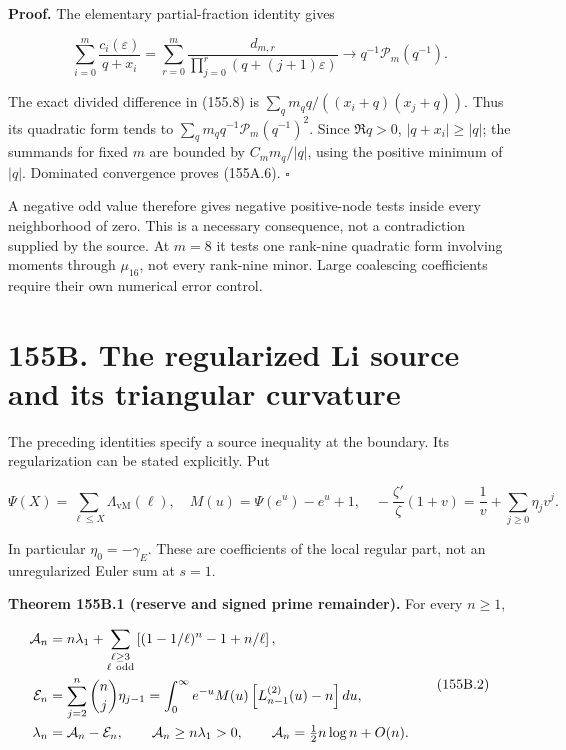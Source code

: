 \documentclass[
  11pt,
]{book}
\begin{document}
\textbf{Proof.} The elementary partial-fraction identity gives

\[
\sum_{i=0}^m\frac{c_i(\varepsilon)}{q+x_i}
=\sum_{r=0}^m\frac{d_{m,r}}{\prod_{j=0}^r(q+(j+1)\varepsilon)}
\longrightarrow q^{-1}\mathcal P_m(q^{-1}).
\]

The exact divided difference in (155.8) is
\(\sum_qm_qq/((x_i+q)(x_j+q))\). Thus its quadratic form tends to
\(\sum_qm_qq^{-1}\mathcal P_m(q^{-1})^2\). Since \(\Re q>0\),
\(|q+x_i|\ge|q|\); the summands for fixed \(m\) are bounded by
\(C_m m_q/|q|\), using the positive minimum of \(|q|\). Dominated
convergence proves (155A.6). \(\square\)

A negative odd value therefore gives negative positive-node tests inside
every neighborhood of zero. This is a necessary consequence, not a
contradiction supplied by the source. At \(m=8\) it tests one rank-nine
quadratic form involving moments through \(\mu_{16}\), not every
rank-nine minor. Large coalescing coefficients require their own
numerical error control.

\section{155B. The regularized Li source and its triangular
curvature}\label{b.-the-regularized-li-source-and-its-triangular-curvature}

The preceding identities specify a source inequality at the boundary.
Its regularization can be stated explicitly. Put

\[
\Psi(X)=\sum_{\ell\le X}\Lambda_{\mathrm{vM}}(\ell),\quad
M(u)=\Psi(e^u)-e^u+1,\quad
-\frac{\zeta'}{\zeta}(1+v)=\frac1v+\sum_{j\ge0}\eta_jv^j.
\tag{155B.1}
\]

In particular \(\eta_0=-\gamma_E\). These are coefficients of the local
regular part, not an unregularized Euler sum at \(s=1\).

\textbf{Theorem 155B.1 (reserve and signed prime remainder).} For every
\(n\ge1\),

\[
\begin{aligned}
\mathcal A_n&=n\lambda_1+
 \sum_{\substack{\ell\ge3\\\ell\ {\rm odd}}}
 \left[(1-1/\ell)^n-1+n/\ell\right],\\
\mathcal E_n&=\sum_{j=2}^n\binom nj\eta_{j-1}
 =\int_0^\infty e^{-u}M(u)\left[L_{n-1}^{(2)}(u)-n\right]du,\\
\lambda_n&=\mathcal A_n-\mathcal E_n,\qquad
\mathcal A_n\ge n\lambda_1>0,\qquad
\mathcal A_n=\tfrac12n\log n+O(n).
\end{aligned}
\tag{155B.2}
\]
\end{document}
